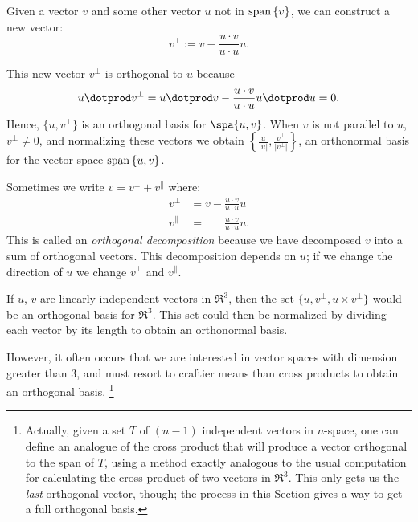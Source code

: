 
\chapter{\gramSchmidtTitle}\label{gramschmidt}


Given a vector $v$ and some other vector $u$ not in  $ {\rm span}\, \{v\} $, we can construct a new vector: 
\[
v^\perp:=v-\frac{u\cdot v}{u\cdot u}u.
\]
\begin{center}

\end{center}
This new vector $v^\perp$ is orthogonal to $u$ because 
\[
u\dotprod v^\perp = u\dotprod v - \frac{u\cdot v}{u\cdot u}u\dotprod u = 0.
\]
Hence, $\{u, v^\perp\}$ is an orthogonal basis for $\spa \{u,v\}$.  When $v$ is not parallel to $u$, $v^\perp \neq 0$, and normalizing these vectors we obtain $\left\{\frac{u}{|u|}, \frac{v^\perp}{|v^\perp|} \right\}$, an orthonormal basis for the vector space ${\rm span}\, \{u,v\}$.

Sometimes we write $v = v^\perp + v^\parallel$ where:
\begin{align*}
v^\perp &= v-\frac{u\cdot v}{u\cdot u}u \\
v^\parallel &= \phantom{v-}\frac{u\cdot v}{u\cdot u}u.
\end{align*}
This is called an \emph{orthogonal decomposition} because we have decomposed $v$ into a sum of orthogonal vectors.  This decomposition depends on $u$; if we change the direction of $u$ we change $v^\perp$ and $v^\parallel$.

If $u$, $v$ are linearly independent vectors in $\Re^3$, then the set $\{u, v^\perp, u\times v^\perp \}$ would be an orthogonal basis for $\Re^3$.  This set could then be normalized by dividing each vector by its length to obtain an orthonormal basis.

However, it often occurs that we are interested in vector spaces with dimension greater than $3$, and must resort to craftier means than cross products to obtain an orthogonal basis.
\footnote{Actually, given a set $T$ of $(n-1)$ independent vectors in $n$-space, one can define an analogue of the cross product that will produce a vector orthogonal to the span of $T$, using a method exactly analogous to the usual computation for calculating the cross product of two vectors in $\Re^3$.  This only gets us the \emph{last} orthogonal vector, though; the process in this Section gives a way to get a full orthogonal basis.}


